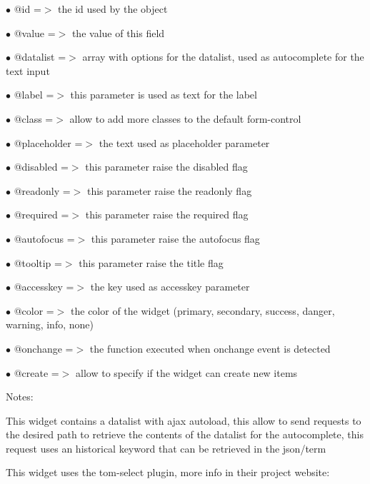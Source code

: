 \documentclass[a4paper]{article}
\begin{document}
\begin{compactitem}
\item[\color{myblue}$\bullet$] @id          =$>$ the id used by the object
\item[\color{myblue}$\bullet$] @value       =$>$ the value of this field
\item[\color{myblue}$\bullet$] @datalist    =$>$ array with options for the datalist, used as autocomplete for the text input
\item[\color{myblue}$\bullet$] @label       =$>$ this parameter is used as text for the label
\item[\color{myblue}$\bullet$] @class       =$>$ allow to add more classes to the default form-control
\item[\color{myblue}$\bullet$] @placeholder =$>$ the text used as placeholder parameter
\item[\color{myblue}$\bullet$] @disabled    =$>$ this parameter raise the disabled flag
\item[\color{myblue}$\bullet$] @readonly    =$>$ this parameter raise the readonly flag
\item[\color{myblue}$\bullet$] @required    =$>$ this parameter raise the required flag
\item[\color{myblue}$\bullet$] @autofocus   =$>$ this parameter raise the autofocus flag
\item[\color{myblue}$\bullet$] @tooltip     =$>$ this parameter raise the title flag
\item[\color{myblue}$\bullet$] @accesskey   =$>$ the key used as accesskey parameter
\item[\color{myblue}$\bullet$] @color       =$>$ the color of the widget (primary, secondary, success, danger, warning, info, none)
\item[\color{myblue}$\bullet$] @onchange    =$>$ the function executed when onchange event is detected
\item[\color{myblue}$\bullet$] @create      =$>$ allow to specify if the widget can create new items
\end{compactitem}

Notes:

This widget contains a datalist with ajax autoload, this allow to send requests
to the desired path to retrieve the contents of the datalist for the autocomplete,
this request uses an historical keyword that can be retrieved in the json/term

This widget uses the tom-select plugin, more info in their project website:
\end{document}
